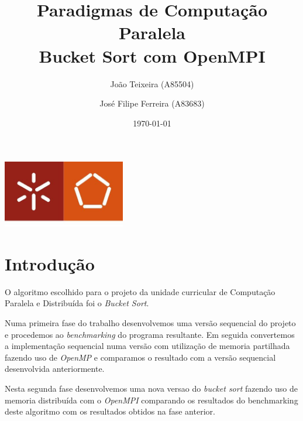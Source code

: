 \documentclass[a4paper]{report}
\begin{document}
\title{Paradigmas de Computação Paralela\\Bucket Sort com OpenMPI}
\author{João Teixeira (A85504) \and José Filipe Ferreira (A83683)}
\date{\today}

\begin{center}
    \begin{minipage}{0.75\linewidth}
        \centering
        \includegraphics[width=0.4\textwidth]{images/eng.jpeg}\par\vspace{1cm}
        \vspace{1.5cm}
        \href{https://www.uminho.pt/PT}
        {\color{black}{\scshape\LARGE Universidade do Minho}} \par
        \vspace{1cm}
        \href{https://www.di.uminho.pt/}
        {\color{black}{\scshape\Large Departamento de Informática}} \par
        \vspace{1.5cm}
        \maketitle
    \end{minipage}
\end{center}

\tableofcontents

\pagebreak

\chapter{Introdução}
O algoritmo escolhido para o projeto da unidade curricular de Computação
Paralela e Distribuída foi o \textit{Bucket Sort}.

Numa primeira fase do trabalho desenvolvemos uma versão sequencial do projeto e
procedemos ao \textit{benchmarking} do programa resultante. Em seguida
convertemos a implementação sequencial numa versão com utilização de memoria
partilhada fazendo uso de \textit{OpenMP} e comparamos o resultado com a versão
sequencial desenvolvida anteriormente.

Nesta segunda fase desenvolvemos uma nova versao do \textit{bucket sort} fazendo
uso de memoria distribuída com o \textit{OpenMPI} comparando os resultados do
benchmarking deste algoritmo com os resultados obtidos na fase anterior.
\end{document}
